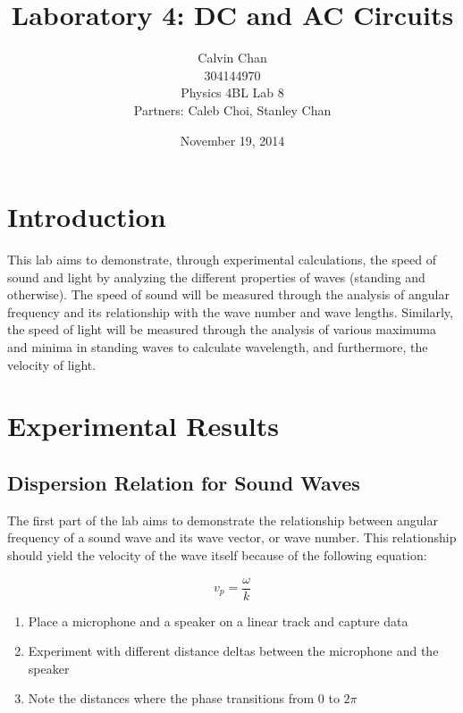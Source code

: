 \documentclass{article}
\begin{document}
\title{Laboratory 4: DC and AC Circuits}
\date{November 19, 2014}
\author{Calvin Chan\\304144970\\Physics 4BL Lab 8\\Partners: Caleb Choi, Stanley
Chan}

\maketitle

\section{Introduction}

This lab aims to demonstrate, through experimental calculations, the speed of
sound and light by analyzing the different properties of waves (standing and
otherwise). The speed of sound will be measured through the analysis of angular
frequency and its relationship with the wave number and wave lengths. Similarly,
the speed of light will be measured through the analysis of various maximuma and
minima in standing waves to calculate wavelength, and furthermore, the velocity
of light.

\section{Experimental Results}

\subsection{Dispersion Relation for Sound Waves}

The first part of the lab aims to demonstrate the relationship between angular
frequency of a sound wave and its wave vector, or wave number. This relationship
should yield the velocity of the wave itself because of the following equation:

\begin{equation}
    \label{phase_velocity}
    v_{p}=\frac{\omega}{k}
\end{equation}

\begin{enumerate}
    \item Place a microphone and a speaker on a linear track and capture data
    \item Experiment with different distance deltas between the microphone and
    the speaker
    \item Note the distances where the phase transitions from 0 to $2\pi$
\end{enumerate}
\end{document}
